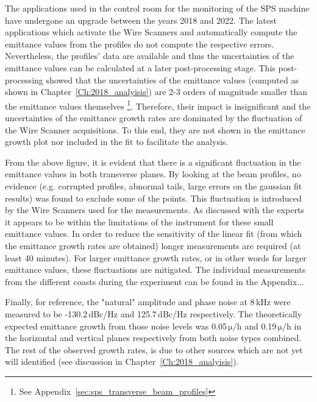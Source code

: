 The applications used in the control room for the monitoring of the SPS machine have undergone an upgrade between the years 2018 and 2022. The latest applications which activate the Wire Scanners and automatically compute the emittance values from the profiles do not compute the respective errors. Nevertheless, the profiles' data are available and thus the uncertainties of the emittance values can be calculated at a later post-processing stage. This post-processing showed that the uncertainties of the emittance values (computed as shown in Chapter~\ref{Ch:2018_analyisis}) are 2-3 orders of magnitude smaller than the emittance values themselves \footnote{See Appendix~\ref{sec:sps_transverse_beam_profiles}}. Therefore, their impact is insignificant and the uncertainties of the emittance growth rates are dominated by the fluctuation of the Wire Scanner acquisitions. To this end, they are not shown in the emittance growth plot nor included in the fit to facilitate the analysis.

From the above figure, it is evident that there is a significant fluctuation in the emittance values in both transverse planes. By looking at the beam profiles, no evidence (e.g. corrupted profiles, abnormal tails, large errors on the gaussian fit results) was found to exclude some of the points. This fluctuation is introduced by the Wire Scanners used for the measurements. As discussed with the experts it appears to be within the limitations of the instrument for these small emittance values. In order to reduce the sensitivity of the linear fit (from which the emittance growth rates are obtained) longer measurements are required (at least 40 minutes). For larger emittance growth rates, or in other words for larger emittance values, these fluctuations are mitigated. The individual measurements from the different coasts during the experiment can be found in the Appendix...

Finally, for reference, the "natural" amplitude and phase noise at 8\,kHz were measured to be -130.2\,dBc/Hz and 125.7\,dBc/Hz respectively. The theoretically~\cite{PhysRevSTAB.18.101001} expected emittance growth from those noise levels was 0.05\,$\mathrm{\mu/h}$ and 0.19\,$\mathrm{\mu/h}$ in the horizontal and vertical planes respectively from both noise types combined.
The rest of the observed growth rates, is due to other sources which are not yet will identified (see discussion in Chapter~\ref{Ch:2018_analyisis}).

